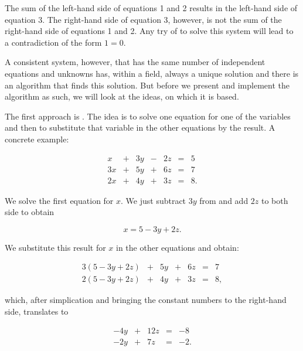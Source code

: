 \documentclass[tikz]{scrreprt}
\begin{document}
The sum of the left-hand side of equations 1 and 2 results in
the left-hand side of equation 3. 
The right-hand side of equation 3, however,
is not the sum of the right-hand side of equations 1 and 2.
Any try of to solve this system will lead to 
a contradiction of the form $1=0$.

A consistent system, however, that has the same number
of independent equations and unknowns has,
within a field, always a unique
solution and there is an algorithm that finds
this solution.
But before we present and implement the algorithm as such,
we will look at the ideas, on which it is based.

The first approach is . The idea is
to solve one equation for one of the variables and then
to substitute that variable in the other equations by
the result. A concrete example:

\begin{equation}
\begin{array}{rcrcrcr}
 x & + & 3y & - & 2z & = &  5\\
3x & + & 5y & + & 6z & = &  7\\
2x & + & 4y & + & 3z & = &  8.
\end{array}
\end{equation}

We solve the first equation for $x$.
We just subtract $3y$ from and add $2z$ to both side
to obtain

\begin{equation}
x = 5 - 3y + 2z.
\end{equation}

We substitute this result for $x$ in the other equations
and obtain:

\begin{equation}
\begin{array}{rcrcrcr}
3(5-3y+2z) & + & 5y & + & 6z & = &  7\\
2(5-3y+2z) & + & 4y & + & 3z & = &  8,
\end{array}
\end{equation}

which, after simplication and bringing the constant
numbers to the right-hand side, translates to

\begin{equation}
\begin{array}{rcrcr}
-4y & + & 12z & = & -8\\
-2y & + & 7z & = &  -2.
\end{array}
\end{equation}
\end{document}
